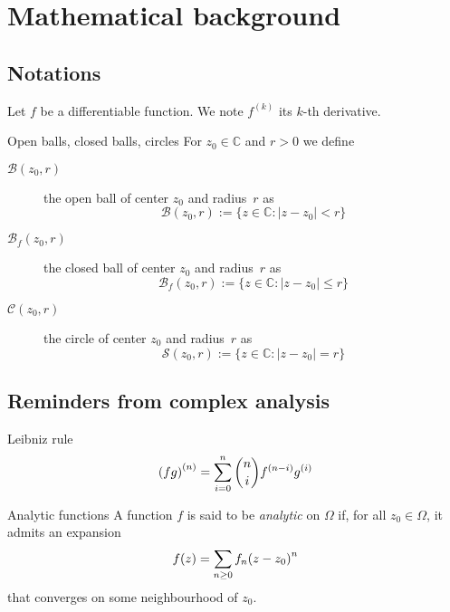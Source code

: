 \documentclass[../main.tex]{subfiles}
\begin{document}
\chapter{Mathematical background}

\section{Notations}

\begin{definition}{}
	Let $f$ be a differentiable function. We note $f^{(k)}$ its $k$-th derivative.
\end{definition}

\begin{definition}{{Open balls, closed balls, circles}}
	For $z_0 \in \mathbb{C}$ and $r > 0$ we define
	\begin{description}
		\item[$\mathcal{B} (z_0, r)$] the open ball of center $z_0$ and radius~$r$ as
		\[
		\mathcal{B} (z_0, r) := \{z \in \mathbb{C} : |z - z_0| < r \}
		\]
		
		\item[$\mathcal{B}_f (z_0, r)$] the closed ball of center $z_0$ and radius~$r$ as
		\[
		\mathcal{B}_f (z_0, r) := \{z \in \mathbb{C} : |z - z_0| \leq r \}
		\]
		
		\item[$\mathcal{C} (z_0, r)$] the circle of center $z_0$ and radius~$r$ as
		\[
		\mathcal{S} (z_0, r) := \{z \in \mathbb{C} : |z - z_0| = r \}
		\]
	\end{description}
\end{definition}

\section{Reminders from complex analysis}


\begin{thm}{Leibniz rule}\label{Leibniz_rule}
	\[
	{(fg)}^{(n)} = \sum\limits_{i=0}^{n} {n \choose i} f^{(n - i)} g^{(i)}
	\]
\end{thm}

\begin{definition}{Analytic functions}
	A function $f$ is said to be \emph{analytic} on $\Omega$ if, for all $z_0 \in \Omega$, it admits an expansion
	\[
	f(z) = \sum\limits_{n \geq 0} f_n {(z - z_0)}^n
	\]
	that converges on some neighbourhood of $z_0$.
\end{definition}
\end{document}
